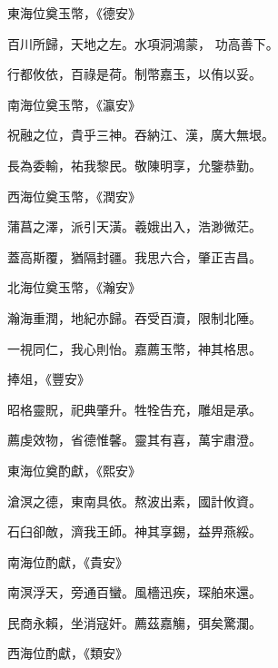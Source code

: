 \begin{pinyinscope}
 東海位奠玉幣，《德安》



 百川所歸，天地之左。水項洞鴻蒙，
 功高善下。



 行都攸依，百祿是荷。制幣嘉玉，以侑以妥。



 南海位奠玉幣，《瀛安》



 祝融之位，貴乎三神。吞納江、漢，廣大無垠。



 長為委輸，祐我黎民。敬陳明享，允鑒恭勤。



 西海位奠玉幣，《潤安》



 蒲菖之澤，派引天潢。羲娥出入，浩渺微茫。



 蓋高斯覆，猶隔封疆。我思六合，肇正吉昌。



 北海位奠玉幣，《瀚安》



 瀚海重潤，地紀亦歸。吞受百瀆，限制北陲。



 一視同仁，我心則怡。嘉薦玉幣，神其格思。



 捧俎，《豐安》



 昭格靈貺，祀典肇升。牲牷告充，雕俎是承。



 薦虔效物，省德惟馨。靈其有喜，萬宇肅澄。



 東海位奠酌獻，《熙安》



 滄溟之德，東南具依。熬波出素，國計攸資。



 石臼卻敵，濟我王師。神其享錫，益畀燕綏。



 南海位酌獻，《貴安》



 南溟浮天，旁通百蠻。風檣迅疾，琛舶來還。



 民商永賴，坐消寇奸。薦茲嘉觴，弭矣驚瀾。



 西海位酌獻，《類安》




\end{pinyinscope}
